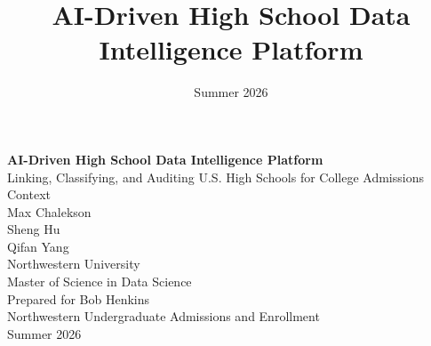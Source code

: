 \documentclass[12pt]{article}
\title{\textbf{AI-Driven High School Data Intelligence Platform}}
\date{Summer 2026}
\begin{document}
\begin{titlepage}
\centering
\vspace*{3cm}

{\LARGE \textbf{AI-Driven High School Data Intelligence Platform}}\\[0.6cm]
{\Large Linking, Classifying, and Auditing U.S. High Schools for College Admissions Context}\\[2.5cm]

{\large Max Chalekson}\\
{\large Sheng Hu}\\
{\large Qifan Yang}\\[1.5cm]

Northwestern University\\
Master of Science in Data Science\\[1.5cm]

Prepared for Bob Henkins\\
Northwestern Undergraduate Admissions and Enrollment\\[3cm]

\vfill
Summer 2026

\end{titlepage}


\end{document}
